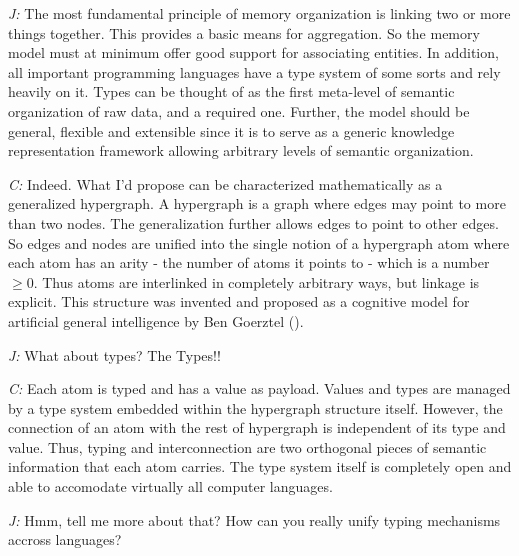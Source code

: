 \documentclass[10pt]{sigplanconf}
\begin{document}
\emph{J:} The most fundamental principle of memory organization is linking two or more things together. This provides a basic means for aggregation. So the memory model must at minimum offer good support for associating entities. In addition, all important programming languages have a type system of some sorts and rely heavily on it. Types can be thought of as the first meta-level of semantic organization of raw data, and a required one. Further, the model should be general, flexible and extensible since it is to serve as a generic knowledge representation framework allowing arbitrary levels of semantic organization.

\emph{C:} Indeed. What I'd propose can be characterized mathematically as a generalized hypergraph. A hypergraph is a graph where edges may point to more than two nodes. The generalization further allows edges to point to other edges. So edges and nodes are unified into the single notion of a hypergraph atom where each atom has an arity - the number of atoms it points to - which is a number $\geq 0$. Thus atoms are interlinked in completely arbitrary ways, but linkage is explicit. This structure was invented and proposed as a cognitive model for artificial general intelligence by Ben Goerztel (\cite{goertzel}).

\emph{J:} What about types? The Types!!

\emph{C:} Each atom is typed and has a value as payload. Values and types are managed by a type system embedded within the hypergraph structure itself. However, the connection of an atom with the rest of hypergraph is independent of its type and value. Thus, typing and interconnection are two orthogonal pieces of semantic information that each atom carries. The type system itself is completely open and able to accomodate virtually all computer languages.

\emph{J:} Hmm, tell me more about that? How can you really unify typing mechanisms accross languages?
\end{document}
